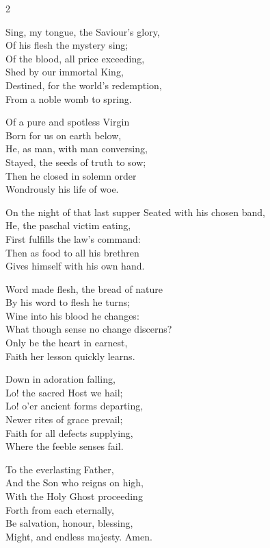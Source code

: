 \begin{multicols}{2}
\raggedcolumns
\begin{enpars}
Sing, my tongue, the Saviour's glory,\\
Of his flesh the mystery sing;\\
Of the blood, all price exceeding,\\
Shed by our immortal King,\\
Destined, for the world's redemption,\\
From a noble womb to spring.

Of a pure and spotless Virgin\\
Born for us on earth below,\\
He, as man, with man conversing,\\
Stayed, the seeds of truth to sow;\\
Then he closed in solemn order\\
Wondrously his life of woe.

On the night of that last supper
Seated with his chosen band,\\
He, the paschal victim eating,\\
First fulfills the law's command:\\
Then as food to all his brethren\\
Gives himself with his own hand.

Word made flesh, the bread of nature\\
By his word to flesh he turns;\\
Wine into his blood he changes:\\
What though sense no change discerns?\\
Only be the heart in earnest,\\
Faith her lesson quickly learns.

Down in adoration falling,\\
Lo! the sacred Host we hail;\\
Lo! o'er ancient forms departing,\\
Newer rites of grace prevail;\\
Faith for all defects supplying,\\
Where the feeble senses fail.

To the everlasting Father,\\
And the Son who reigns on high,\\
With the Holy Ghost proceeding\\
Forth from each eternally,\\
Be salvation, honour, blessing,\\
Might, and endless majesty.
Amen.
\end{enpars}
\end{multicols}
